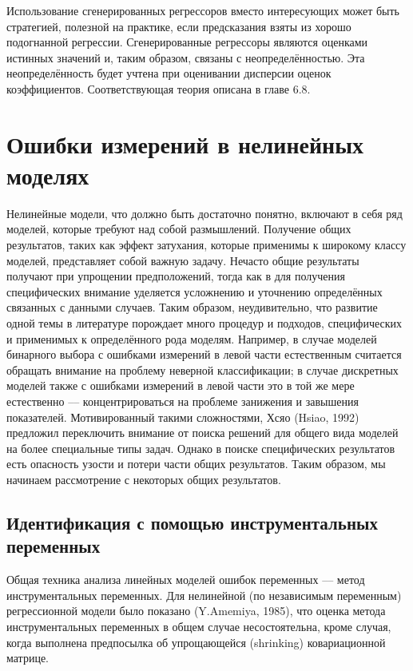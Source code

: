 Использование сгенерированных регрессоров вместо интересующих может быть стратегией, полезной на практике, если предсказания взяты из хорошо подогнанной регрессии. Сгенерированные регрессоры являются оценками истинных значений и, таким образом, связаны с неопределённостью. Эта неопределённость будет учтена при оценивании дисперсии оценок коэффициентов. Соответствующая теория описана в главе 6.8.

\section{Ошибки измерений в нелинейных моделях} 
Нелинейные модели, что должно быть достаточно понятно, включают в себя ряд моделей, которые требуют над собой размышлений. Получение общих результатов, таких как эффект затухания, которые применимы к широкому классу моделей, представляет собой важную задачу. Нечасто общие результаты получают при упрощении предположений, тогда как в для получения специфических внимание уделяется усложнению и уточнению определённых связанных с данными случаев. Таким образом, неудивительно, что развитие одной темы в литературе порождает много процедур и подходов, специфических и применимых к определённого рода моделям. Например, в случае моделей бинарного выбора с ошибками измерений в левой части естественным считается обращать внимание на проблему неверной классификации; в случае дискретных моделей также с ошибками измерений в левой части это в той же мере естественно --– концентрироваться на проблеме занижения и завышения показателей. Мотивированный такими сложностями, Хсяо (Hsiao, 1992) предложил переключить внимание от поиска решений для общего вида моделей на более специальные типы задач. Однако в поиске специфических результатов есть опасность узости и потери части общих результатов. Таким образом, мы начинаем рассмотрение с некоторых общих результатов.

\subsection{Идентификация с помощью инструментальных переменных} 
Общая техника анализа линейных моделей ошибок переменных --– метод инструментальных переменных. Для нелинейной (по независимым переменным) регрессионной модели было показано (Y.Amemiya, 1985), что оценка метода инструментальных переменных в общем случае несостоятельна, кроме случая, когда выполнена предпосылка об упрощающейся (shrinking) ковариационной матрице.

